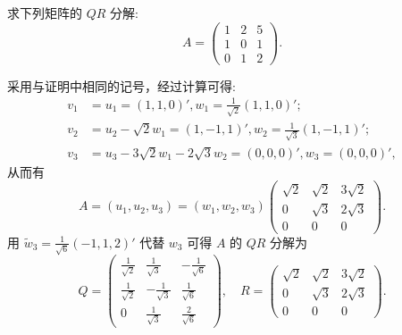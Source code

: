 \documentclass[../../main.tex]{subfiles}%
\begin{document}
\begin{example}
求下列矩阵的 $QR$ 分解:
\[
A = \begin{pmatrix}
1 & 2 & 5 \\
1 & 0 & 1 \\
0 & 1 & 2
\end{pmatrix}.
\]
\end{example}
\begin{solution}
采用与证明中相同的记号，经过计算可得:
\begin{align*}
v_1&=u_1=(1,1,0)' ,w_1=\frac{1}{\sqrt{2}}(1,1,0)' ;
\\
v_2&=u_2-\sqrt{2}w_1=(1,-1,1)' ,w_2=\frac{1}{\sqrt{3}}(1,-1,1)' ;
\\
v_3&=u_3-3\sqrt{2}w_1-2\sqrt{3}w_2=(0,0,0)' ,w_3=(0,0,0)',
\end{align*}
从而有
\[
A = (u_1,u_2,u_3) = (w_1,w_2,w_3)\begin{pmatrix}
\sqrt{2} & \sqrt{2} & 3\sqrt{2} \\
0 & \sqrt{3} & 2\sqrt{3} \\
0 & 0 & 0
\end{pmatrix}.
\]
用 $\widetilde{w}_3 = \frac{1}{\sqrt{6}}(-1,1,2)'$ 代替 $w_3$ 可得 $A$ 的 $QR$ 分解为
\[
Q = \begin{pmatrix}
\frac{1}{\sqrt{2}} & \frac{1}{\sqrt{3}} & -\frac{1}{\sqrt{6}} \\
\frac{1}{\sqrt{2}} & -\frac{1}{\sqrt{3}} & \frac{1}{\sqrt{6}} \\
0 & \frac{1}{\sqrt{3}} & \frac{2}{\sqrt{6}}
\end{pmatrix}, \quad
R = \begin{pmatrix}
\sqrt{2} & \sqrt{2} & 3\sqrt{2} \\
0 & \sqrt{3} & 2\sqrt{3} \\
0 & 0 & 0
\end{pmatrix}.
\] 

\end{solution}
\end{document}
